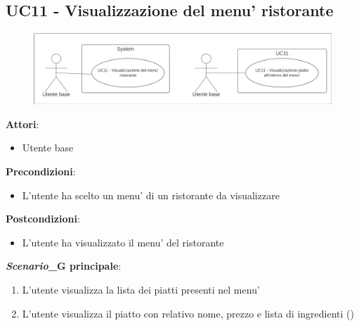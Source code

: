 \subsection{UC11 - Visualizzazione del menu' ristorante} \label{usecase:11}
\begin{figure}[H]
    \centering
    \includegraphics[width=0.9\linewidth]{ucd/ucd11.png}
\end{figure}
\textbf{Attori}:
\begin{itemize}
    \item Utente base
\end{itemize}
\textbf{Precondizioni}:
\begin{itemize}
    \item L'utente ha scelto un menu' di un ristorante da visualizzare
\end{itemize}
\textbf{Postcondizioni}:
\begin{itemize}
    \item L'utente ha visualizzato il menu' del ristorante
\end{itemize}
\textbf{\textit{Scenario}_G principale}:
\begin{enumerate}
    \item L'utente visualizza la lista dei piatti presenti nel menu'
    \item L’utente visualizza il piatto con relativo nome, prezzo e lista di ingredienti ()
\end{enumerate}


